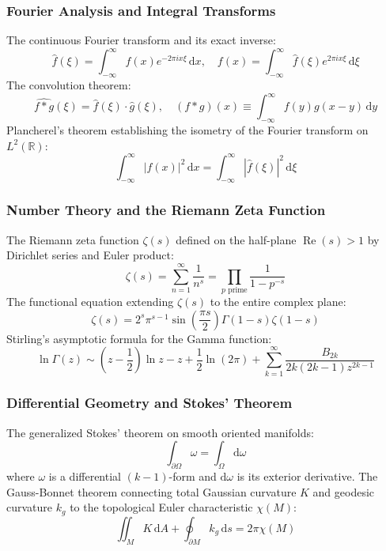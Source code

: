\documentclass[11pt, a4paper]{article}
\begin{document}
\subsubsection{Fourier Analysis and Integral Transforms}
The continuous Fourier transform and its exact inverse:
\begin{equation}
\hat{f}(\xi) = \int_{-\infty}^\infty f(x) e^{-2\pi i x \xi} \, \mathrm{d}x, \quad f(x) = \int_{-\infty}^\infty \hat{f}(\xi) e^{2\pi i x \xi} \, \mathrm{d}\xi
\end{equation}
The convolution theorem:
\begin{equation}
\widehat{f * g}(\xi) = \hat{f}(\xi) \cdot \hat{g}(\xi), \quad (f * g)(x) \equiv \int_{-\infty}^\infty f(y) g(x - y) \, \mathrm{d}y
\end{equation}
Plancherel's theorem establishing the isometry of the Fourier transform on $L^2(\mathbb{R})$:
\begin{equation}
\int_{-\infty}^\infty |f(x)|^2 \, \mathrm{d}x = \int_{-\infty}^\infty |\hat{f}(\xi)|^2 \, \mathrm{d}\xi
\end{equation}

\subsubsection{Number Theory and the Riemann Zeta Function}
The Riemann zeta function $\zeta(s)$ defined on the half-plane $\operatorname{Re}(s) > 1$ by Dirichlet series and Euler product:
\begin{equation}
\zeta(s) = \sum_{n=1}^\infty \frac{1}{n^s} = \prod_{p \text{ prime}} \frac{1}{1 - p^{-s}}
\end{equation}
The functional equation extending $\zeta(s)$ to the entire complex plane:
\begin{equation}
\zeta(s) = 2^s \pi^{s-1} \sin\left(\frac{\pi s}{2}\right) \Gamma(1 - s) \zeta(1 - s)
\end{equation}
Stirling's asymptotic formula for the Gamma function:
\begin{equation}
\ln \Gamma(z) \sim \left( z - \frac{1}{2} \right) \ln z - z + \frac{1}{2} \ln(2\pi) + \sum_{k=1}^\infty \frac{B_{2k}}{2k(2k-1)z^{2k-1}}
\end{equation}

\subsubsection{Differential Geometry and Stokes' Theorem}
The generalized Stokes' theorem on smooth oriented manifolds:
\begin{equation}
\int_{\partial \Omega} \omega = \int_\Omega \mathrm{d}\omega
\end{equation}
where $\omega$ is a differential $(k-1)$-form and $\mathrm{d}\omega$ is its exterior derivative.
The Gauss-Bonnet theorem connecting total Gaussian curvature $K$ and geodesic curvature $k_g$ to the topological Euler characteristic $\chi(M)$:
\begin{equation}
\iint_M K \, \mathrm{d}A + \oint_{\partial M} k_g \, \mathrm{d}s = 2\pi \chi(M)
\end{equation}
\end{document}
